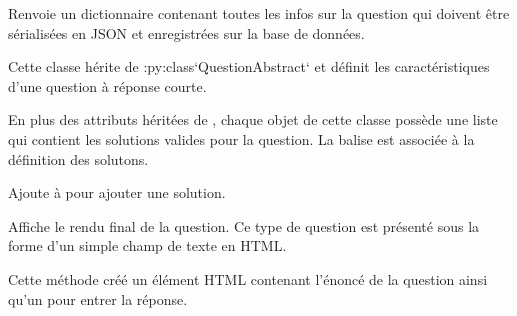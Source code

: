 \documentclass[a4paper,11pt,openany,oneside]{sphinxmanual}
\begin{document}
\begin{fulllineitems}
\begin{fulllineitems}
\end{fulllineitems}


\begin{fulllineitems}
\label{front-end:QuestionAbstract.properties}
Renvoie un dictionnaire contenant toutes les infos sur la question qui doivent
être sérialisées en JSON et enregistrées sur la base de données.

\end{fulllineitems}


\end{fulllineitems}


\begin{fulllineitems}
\label{front-end:SimpleQuestion}
Cette classe hérite de :py:class{}`QuestionAbstract{}` et définit les caractéristiques
d'une question à réponse courte.

En plus des attributs héritées de , chaque objet
de cette classe possède une liste  qui contient les solutions valides
pour la question. La balise \code{=} est associée à la définition des solutons.

\begin{fulllineitems}
\label{front-end:SimpleQuestion.add_answer}
Ajoute  à  pour ajouter une solution.

\end{fulllineitems}


\begin{fulllineitems}
\label{front-end:SimpleQuestion.render}
Affiche le rendu final de la question. Ce type de question est présenté sous
la forme d'un simple champ de texte en HTML.

Cette méthode créé un élément HTML  contenant l'énoncé de la question
ainsi qu'un  pour entrer la réponse.

\end{fulllineitems}


\end{fulllineitems}
\end{document}
